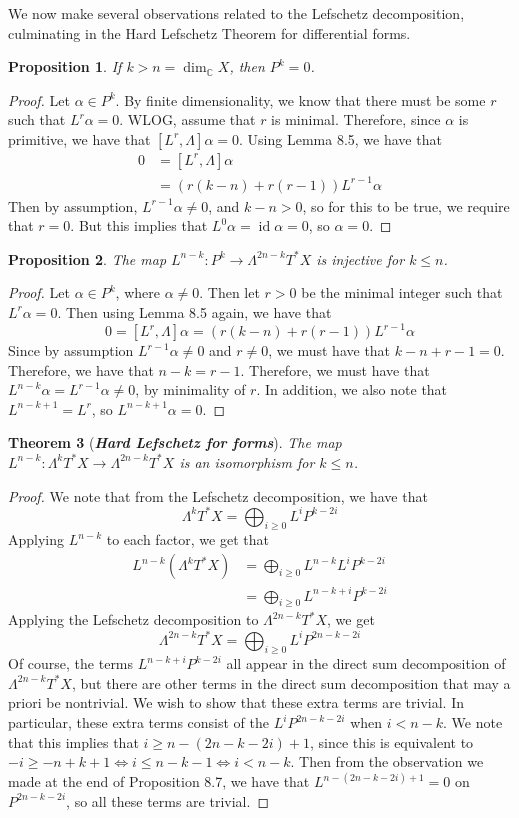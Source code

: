 \documentclass[psamsfonts, 12pt]{amsart}
\newtheorem{thm}{Theorem}[section]
\newtheorem{prop}[thm]{Proposition}
\theoremstyle{definition}
\theoremstyle{remark}
\newcommand{\ib}[1]{\textbf{\textit{#1}}}
\newcommand{\C}{\mathbb{C}}
\DeclareMathOperator{\id}{id}
\begin{document}
%
We now make several observations related to the Lefschetz decomposition, culminating in
the Hard Lefschetz Theorem for differential forms.
%
\begin{prop}
If $k > n = \dim_\C X$, then $P^k = 0$.
\end{prop}
%
\begin{proof}
Let $\alpha \in P^k$. By finite dimensionality, we know that there must be some $r$
such that $L^r\alpha = 0$. WLOG, assume that $r$ is minimal. Therefore, since $\alpha$
is primitive, we have that $[L^r,\Lambda]\alpha = 0$. Using Lemma 8.5, we have that
\begin{align*}
0 &= [L^r,\Lambda]\alpha \\
&= (r(k-n) + r(r-1))L^{r-1}\alpha
\end{align*}
Then by assumption, $L^{r-1}\alpha \neq 0$, and $k-n > 0$, so for this to be true,
we require that $r=0$. But this implies that $L^0\alpha = \id\alpha = 0$, so
$\alpha = 0$.
\end{proof}
%
\begin{prop}
The map $L^{n-k} : P^k \to \Lambda^{2n-k}T^*X$ is injective for $k \leq n$.
\end{prop}
%
\begin{proof}
Let $\alpha \in P^k$, where $\alpha \neq 0$. Then let $r > 0$ be the minimal integer
such that $L^r\alpha = 0$. Then using Lemma 8.5 again, we have that
\[
0 = [L^r, \Lambda]\alpha = (r(k-n) + r(r-1))L^{r-1}\alpha
\]
Since by assumption $L^{r-1}\alpha \neq 0$ and $r \neq 0$, we must have that
$k-n + r - 1 = 0$. Therefore, we have that $n-k = r-1$. Therefore, we must have that
$L^{n-k}\alpha = L^{r-1}\alpha \neq 0$, by minimality of $r$. In addition, we also
note that $L^{n-k+1} = L^r$, so $L^{n-k+1}\alpha = 0$.
\end{proof}
%
\begin{thm}[\ib{Hard Lefschetz for forms}]
The map $L^{n-k} : \Lambda^kT^*X \to \Lambda^{2n-k}T^*X$ is an isomorphism for
$k \leq n$.
\end{thm}
%
\begin{proof}
We note that from the Lefschetz decomposition, we have that
\[
\Lambda^kT^*X = \bigoplus_{i \geq 0 } L^iP^{k-2i}
\]
Applying $L^{n-k}$ to each factor, we get that
\begin{align*}
L^{n-k}(\Lambda^kT^*X) &= \bigoplus_{i\geq 0 }L^{n-k}L^iP^{k-2i} \\
&= \bigoplus_{i\geq 0} L^{n-k+i}P^{k-2i}
\end{align*}
Applying the Lefschetz decomposition to $\Lambda^{2n-k}T^*X$, we get
\[
\Lambda^{2n-k}T^*X = \bigoplus_{i\geq 0} L^iP^{2n-k-2i}
\]
Of course, the terms $L^{n-k+i}P^{k-2i}$ all appear in the direct sum decomposition of
$\Lambda^{2n-k}T^*X$, but there are other terms in the direct sum decomposition that
may a priori be nontrivial. We wish to show that these extra terms are trivial. In
particular, these extra terms consist of the $L^iP^{2n-k-2i}$ when $i < n-k$.
We note that this implies that $i \geq n-(2n-k-2i)+1$, since this is equivalent to
$-i \geq -n +k + 1 \iff i \leq n-k - 1 \iff i < n-k$. Then from the observation we made
at the end of Proposition 8.7, we have that
$L^{n-(2n-k-2i)+1} = 0$ on $P^{2n-k-2i}$, so all these terms are trivial.
\end{proof}
\end{document}
